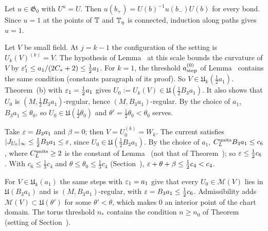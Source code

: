 \begin{detail}\label{d11a:A1}
\begin{step}
Let $u\in\mathfrak G_0$ with $U^u=U$. Then $u(b_+)=U(b)^{-1}u(b_-)U(b)$ for every bond. Since $u=1$ at the points of $\mathbb T$ and $\mathbb T_\eta$ is connected, induction along paths gives $u=1$.
\end{step}
\begin{step}[$\theta=\theta_0$ is allowed]
Let $V$ be small field. At $j=k-1$ the configuration of the setting is $U_k(V)^{(k)}=V$. The hypothesis of Lemma~ at this scale bounds the curvature of $V$ by $\varepsilon'_1\le a_1/(2C_*+2)\le\frac12a_1$. For $k=1$, the threshold $a^{(0)}_{\rm step}$ of Lemma~ contains the same condition (constants paragraph of its proof). So $V\in\mathfrak U_k(\frac12a_1)$. Theorem~(b) with $\varepsilon_1=\frac12a_1$ gives $U_0:=U_k(V)\in\mathfrak U(\frac12B_3a_1)$. It also shows that $U_0$ is $(M,\frac12B_3a_1)$-regular, hence $(M,B_3a_1)$-regular. By the choice of $a_1$, $B_3a_1\le\theta_0$, so $U_0\in\mathfrak U(\frac12\theta_0)$ and $\theta'=\frac12\theta_0<\theta_0$ serves.
\end{step}
\begin{step}
Take $\varepsilon=B_3a_1$ and $\beta=0$; then $V=U_0^{(k)}=W_k$. The current satisfies $|J_{U_0}|_\infty\le\frac12B_3a_1\le\varepsilon$, since $U_0\in\mathfrak U(\frac12B_3a_1)$. By the choice of $a_1$, $C^{\rm units}_LB_3a_1\le c_6$, where $C^{\rm units}_L\ge2$ is the constant of Lemma~ (not that of Theorem~); so $\varepsilon\le\frac12c_6$. With $c_6\le\frac13c_4$ and $\theta\le\theta_0\le\frac13c_4$ (Section~), $\varepsilon+\theta+\beta\le\frac12c_4<c_4$.
\end{step}
\begin{step}
For $V\in\mathfrak U_k(a_1)$ the same steps with $\varepsilon_1=a_1$ give that every $U_0\in\mathscr M(V)$ lies in $\mathfrak U(B_3a_1)$ and is $(M,B_3a_1)$-regular, with $\varepsilon=B_3a_1\le\frac12c_6$. Admissibility adds $\mathscr M(V)\subset\mathfrak U(\theta')$ for some $\theta'<\theta$, which makes $0$ an interior point of the chart domain. The torus threshold $n_*$ contains the condition $n\ge n_0$ of Theorem~ (setting of Section~).
\end{step}
\end{detail}

